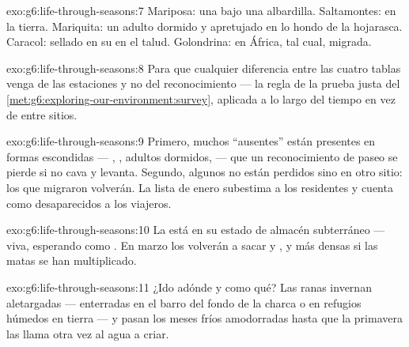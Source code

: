 \begin{solution}{exo:g6:life-through-seasons:7}
Mariposa: una  bajo una albardilla. Saltamontes:  en la
tierra. Mariquita: un adulto dormido y apretujado en lo hondo de la
hojarasca. Caracol: sellado en su  en el talud. Golondrina: en
África, tal cual, migrada.
\end{solution}

\begin{solution}{exo:g6:life-through-seasons:8}
Para que cualquier diferencia entre las cuatro tablas venga de las
estaciones y no del reconocimiento --- la regla de la prueba justa del
\cref{met:g6:exploring-our-environment:survey}, aplicada a lo largo del
tiempo en vez de entre sitios.
\end{solution}

\begin{solution}{exo:g6:life-through-seasons:9}
Primero, muchos ``ausentes'' están presentes en formas escondidas ---
, , adultos dormidos,  --- que un reconocimiento
de paseo se pierde si no cava y levanta. Segundo, algunos no están
perdidos sino en otro sitio: los que migraron volverán. La lista de
enero subestima a los residentes y cuenta como desaparecidos a los
viajeros.
\end{solution}

\begin{solution}{exo:g6:life-through-seasons:10}
La  está en su estado de almacén subterráneo --- viva, esperando
como . En marzo los  volverán a sacar  y , y más
densas si las matas se han multiplicado.
\end{solution}

\begin{solution}{exo:g6:life-through-seasons:11}
¿Ido adónde y como qué? Las ranas invernan aletargadas --- enterradas
en el barro del fondo de la charca o en refugios húmedos en tierra ---
y pasan los meses fríos amodorradas hasta que la primavera las llama
otra vez al agua a criar.
\end{solution}

